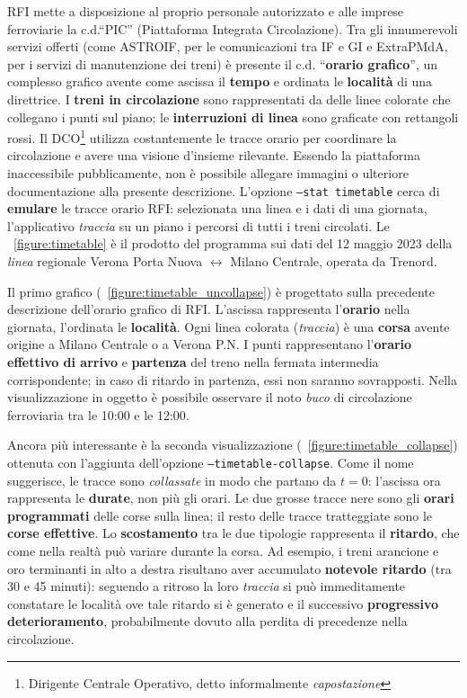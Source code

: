 \documentclass[12pt,a4paper,italian]{report}
\begin{document}
RFI mette a disposizione al proprio personale autorizzato e alle
imprese ferroviarie la c.d.\@ ``PIC'' (Piattaforma Integrata
Circolazione).  Tra gli innumerevoli servizi offerti \cite{RfiPic}
(come ASTROIF, per le comunicazioni tra IF e GI e ExtraPMdA, per i
servizi di manutenzione dei treni) è presente il c.d.\@
``\textbf{orario grafico}'', un complesso grafico avente come ascissa
il \textbf{tempo} e ordinata le \textbf{località} di una direttrice.
I \textbf{treni in circolazione} sono rappresentati da delle linee
colorate che collegano i punti sul piano; le \textbf{interruzioni di
    linea} sono graficate con rettangoli rossi.  Il
DCO\footnote{Dirigente Centrale Operativo, detto informalmente
    \textit{capostazione}} utilizza costantemente le tracce orario per
coordinare la circolazione e avere una visione d'insieme rilevante.
Essendo la piattaforma inaccessibile pubblicamente, non è possibile
allegare immagini o ulteriore documentazione alla presente
descrizione.  L'opzione \texttt{--stat timetable} cerca di
\textbf{emulare} le tracce orario RFI: selezionata una linea e i dati
di una giornata, l'applicativo \textit{traccia} su un piano i percorsi
di tutti i treni circolati.  Le \figurename~\ref{figure:timetable} è
il prodotto del programma sui dati del 12 maggio 2023 della
\textit{linea} regionale Verona Porta Nuova $\leftrightarrow$ Milano
Centrale, operata da Trenord.

Il primo grafico (\figurename~\ref{figure:timetable_uncollapse}) è
progettato sulla precedente descrizione dell'orario grafico di RFI.
L'ascissa rappresenta l'\textbf{orario} nella giornata, l'ordinata le
\textbf{località}.  Ogni linea colorata (\textit{traccia}) è una
\textbf{corsa} avente origine a Milano Centrale o a Verona P.N\@.  I
punti rappresentano l'\textbf{orario effettivo di arrivo} e
\textbf{partenza} del treno nella fermata intermedia corrispondente;
in caso di ritardo in partenza, essi non saranno sovrapposti.  Nella
visualizzazione in oggetto è possibile osservare il noto \textit{buco}
di circolazione ferroviaria tra le 10:00 e le 12:00.

Ancora più interessante è la seconda visualizzazione
(\figurename~\ref{figure:timetable_collapse}) ottenuta con l'aggiunta
dell'opzione \texttt{--timetable-\-collapse}.  Come il nome
suggerisce, le tracce sono \textit{collassate} in modo che partano da
$t = 0$: l'ascissa ora rappresenta le \textbf{durate}, non più gli
orari.  Le due grosse tracce nere sono gli \textbf{orari programmati}
delle corse sulla linea; il resto delle tracce tratteggiate sono le
\textbf{corse effettive}.  Lo \textbf{scostamento} tra le due
tipologie rappresenta il \textbf{ritardo}, che come nella realtà può
variare durante la corsa.  Ad esempio, i treni arancione e oro
terminanti in alto a destra risultano aver accumulato \textbf{notevole
    ritardo} (tra 30 e 45 minuti): seguendo a ritroso la loro
\textit{traccia} si può immeditamente constatare le località ove tale
ritardo si è generato e il successivo \textbf{progressivo
    deterioramento}, probabilmente dovuto alla perdita di precedenze
nella circolazione.
\end{document}
